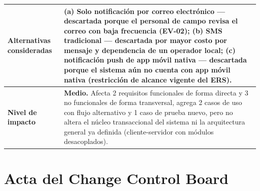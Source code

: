 \documentclass[11pt,a4paper]{article}
\begin{document}
\begin{longtable}{|p{4.5cm}|p{10cm}|}
Alternativas consideradas & (a) Solo notificación por correo electrónico — descartada porque el personal de campo revisa el correo con baja frecuencia (EV-02); (b) SMS tradicional — descartada por mayor costo por mensaje y dependencia de un operador local; (c) notificación push de app móvil nativa — descartada porque el sistema aún no cuenta con app móvil nativa (restricción de alcance vigente del ERS). \\ \hline
\textbf{Nivel de impacto} & \textbf{Medio.} Afecta 2 requisitos funcionales de forma directa y 3 no funcionales de forma transversal, agrega 2 casos de uso con flujo alternativo y 1 caso de prueba nuevo, pero no altera el núcleo transaccional del sistema ni la arquitectura general ya definida (cliente-servidor con módulos desacoplados). \\ \hline
\end{longtable}

\section{Acta del Change Control Board}
\end{document}
